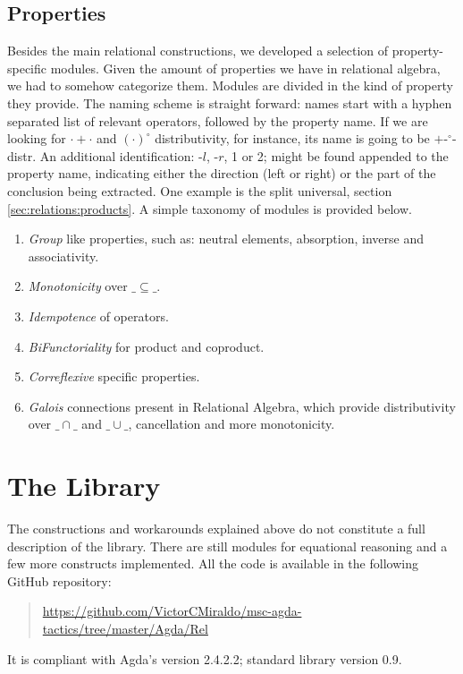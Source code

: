 \subsection{Properties}

Besides the main relational constructions, we developed a selection of property-specific modules.
Given the amount of properties we have in relational algebra, we had to somehow categorize them.
Modules are divided in the kind of property they provide. The naming scheme is straight forward:
names start with a hyphen separated list of relevant operators, followed by the property name.
If we are looking for $\cdot + \cdot$ and $(\cdot)^\circ$ distributivity, for instance, 
its name is going to be $+$-$^\circ$-distr. An additional identification: -$l$, -$r$, 1 or 2; might be found
appended to the property name, indicating either the direction (left or right) or the part of 
the conclusion being extracted. One example is the split universal, section \ref{sec:relations:products}.
A simple taxonomy of modules is provided below.

\begin{enumerate}
  \item \emph{Group} like properties, such as: neutral elements, absorption, inverse and associativity.
  \item \emph{Monotonicity} over $\_\subseteq\_$.
  \item \emph{Idempotence} of operators.
  \item \emph{BiFunctoriality} for product and coproduct.
  \item \emph{Correflexive} specific properties.
  \item \emph{Galois} connections present in Relational Algebra, which provide
                distributivity over $\_\cap\_$ and $\_\cup\_$, cancellation and
                more monotonicity.
\end{enumerate}

\section{The Library}

The constructions and workarounds explained above do not constitute a full description of the library.
There are still modules for equational reasoning and a few more constructs implemented.
All the code is available in the following GitHub repository: 
\begin{quote}
\small \url{https://github.com/VictorCMiraldo/msc-agda-tactics/tree/master/Agda/Rel}
\end{quote}
It is compliant with Agda's version 2.4.2.2; standard library version 0.9.

